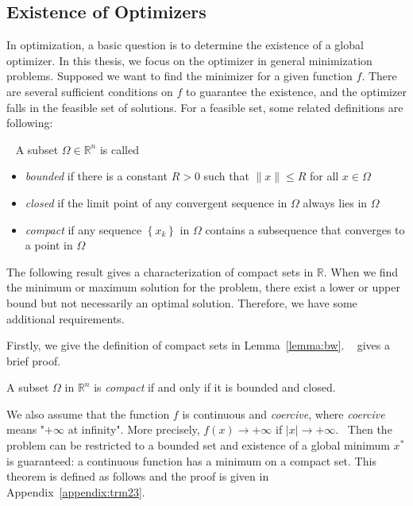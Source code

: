 \subsection{Existence of Optimizers}
In optimization, a basic question is to determine the existence of a global optimizer. In this thesis, we focus on the optimizer in general minimization problems. Supposed we want to find the minimizer for a given function $f$. There are several sufficient conditions on $f$ to guarantee the existence, and the optimizer falls in the feasible set of solutions. For a feasible set, some related definitions are following: 
\begin{defn}~\citep{JS:06}
    A subset $\Omega \in \mathbb{R}^n$ is called
    \begin{itemize}
        \item \emph{bounded} if there is a constant $R > 0$ such that $\|x\| \leq R$ for all $x \in \Omega$
        \item \emph{closed} if the limit point of any convergent sequence in $\Omega$ always lies in $\Omega$
        \item \emph{compact} if any sequence $\left\{x_{k}\right\}$ in $\Omega$ contains a subsequence that converges to a point in $\Omega$
    \end{itemize}
\end{defn}
\par The following result gives a characterization of compact sets in $\mathbb{R}$. When we find the minimum or maximum solution for the problem, there exist a lower or upper bound but not necessarily an optimal solution. Therefore, we have some additional requirements. 
\par Firstly, we give the definition of compact sets in Lemma~\ref{lemma:bw}. ~\citep{OG:17} gives a brief proof.
\begin{lemma}
    \label{lemma:bw}
    A subset $\Omega$ in $\mathbb{R}^n$ is \emph{compact} if and only if it is bounded and closed.
\end{lemma}
\par We also assume that the function $f$ is continuous and \emph{coercive}, where \emph{coercive} means "$+\infty$ at infinity". More precisely, $f(x) \rightarrow+\infty$ if $|x| \rightarrow+\infty$.~\citep{JS:06} Then the problem can be restricted to a bounded set and existence of a global minimum $x^{*}$ is guaranteed: a continuous function has a minimum on a compact set. This theorem is defined as follows and the proof is given in Appendix~\ref{appendix:trm23}.
